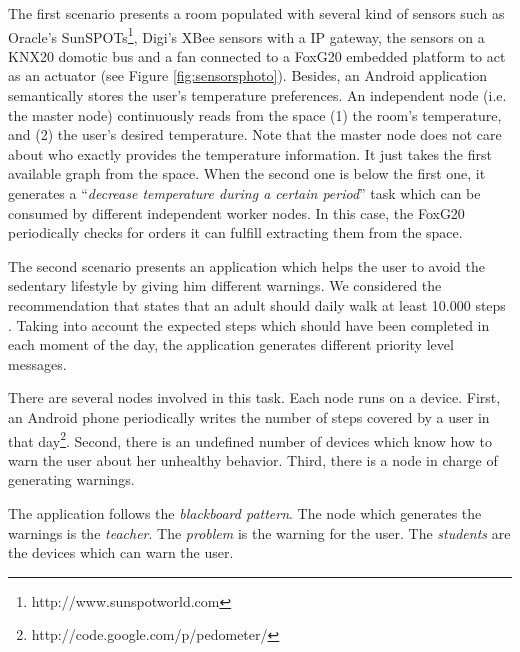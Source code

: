 \bigskip

The first scenario presents a room populated with several kind of sensors such as Oracle's SunSPOTs\footnote{http://www.sunspotworld.com},
Digi's XBee sensors with a IP gateway,
the sensors on a KNX20 domotic bus and a fan connected to a FoxG20 embedded platform to act as an actuator (see Figure \ref{fig:sensorsphoto}).
Besides, an Android application semantically stores the user's temperature preferences.
An independent node (i.e. the master node) continuously reads from the space %
(1) the room's temperature, and
(2) the user's desired temperature.
Note that the master node does not care about who exactly provides the temperature information.
It just takes the first available graph from the space.
When the second one is below the first one, it generates a ``\emph{decrease temperature during a certain period}'' task which can be consumed by different independent worker nodes.
In this case, the FoxG20 periodically checks for orders it can fulfill extracting them from the space. %


\medskip


The second scenario presents an application which helps the user to avoid the sedentary lifestyle by giving him different warnings.
We considered the recommendation that states that an adult should daily walk at least 10.000 steps \citep{tudor2002taking}.
Taking into account the expected steps which should have been completed in each moment of the day, the application generates different priority level messages.

There are several nodes involved in this task.
Each node runs on a device. %
First, an Android phone periodically writes the number of steps covered by a user in that day\footnote{http://code.google.com/p/pedometer/}.
Second, there is an undefined number of devices which know how to warn the user about her unhealthy behavior.
Third, there is a node in charge of generating warnings.


The application follows the \emph{blackboard pattern}.
The node which generates the warnings is the \emph{teacher}.
The \emph{problem} is the warning for the user.
The \emph{students} are the devices which can warn the user.


